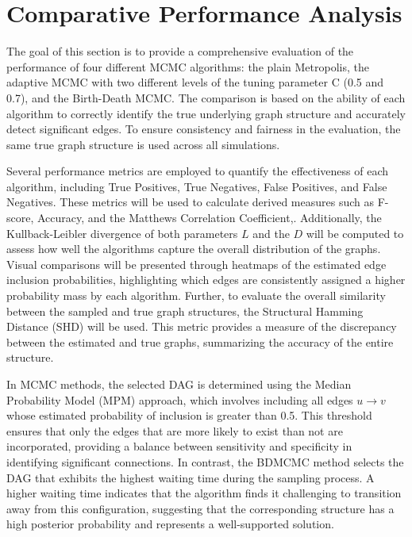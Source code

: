 \documentclass{report}
\begin{document}
\section{Comparative Performance Analysis}

The goal of this section is to provide a comprehensive evaluation of the performance of four different MCMC algorithms: the plain Metropolis, the adaptive MCMC with two different levels of the tuning parameter C (0.5 and 0.7), and the Birth-Death MCMC. The comparison is based on the ability of each algorithm to correctly identify the true underlying graph structure and accurately detect significant edges. To ensure consistency and fairness in the evaluation, the same true graph structure is used across all simulations.

Several performance metrics are employed to quantify the effectiveness of each algorithm, including True Positives, True Negatives, False Positives, and False Negatives. These metrics will be used to calculate derived measures such as F-score, Accuracy, and the Matthews Correlation Coefficient,. Additionally, the Kullback-Leibler divergence of both parameters $L$ and the $D$ will be computed to assess how well the algorithms capture the overall distribution of the graphs.
Visual comparisons will be presented through heatmaps of the estimated edge inclusion probabilities, highlighting which edges are consistently assigned a higher probability mass by each algorithm. Further, to evaluate the overall similarity between the sampled and true graph structures, the Structural Hamming Distance (SHD) will be used. This metric provides a measure of the discrepancy between the estimated and true graphs, summarizing the accuracy of the entire structure.

In MCMC methods, the selected DAG is determined using the Median Probability Model (MPM) approach, which involves including all edges $u \rightarrow v$ whose estimated probability of inclusion is greater than 0.5. This threshold ensures that only the edges that are more likely to exist than not are incorporated, providing a balance between sensitivity and specificity in identifying significant connections. In contrast, the BDMCMC method selects the DAG that exhibits the highest waiting time during the sampling process. A higher waiting time indicates that the algorithm finds it challenging to transition away from this configuration, suggesting that the corresponding structure has a high posterior probability and represents a well-supported solution.
\end{document}

